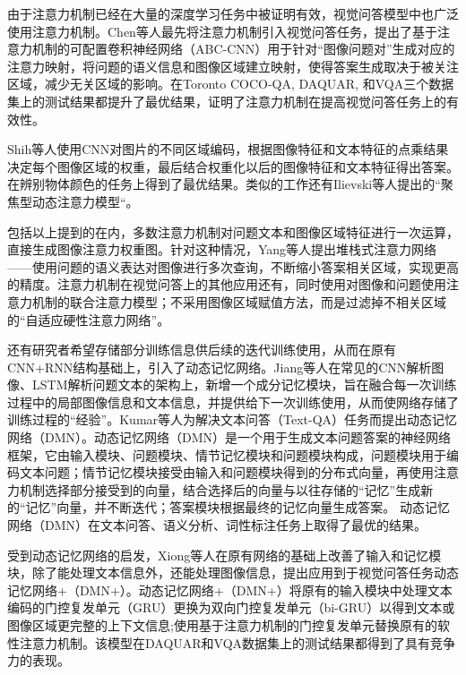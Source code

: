 由于注意力机制已经在大量的深度学习任务中被证明有效，视觉问答模型中也广泛使用注意力机制。Chen等人最先将注意力机制引入视觉问答任务，提出了基于注意力机制的可配置卷积神经网络（ABC-CNN）用于针对“图像问题对”生成对应的注意力映射，将问题的语义信息和图像区域建立映射，使得答案生成取决于被关注区域，减少无关区域的影响。在Toronto COCO-QA, DAQUAR, 和VQA三个数据集上的测试结果都提升了最优结果，证明了注意力机制在提高视觉问答任务上的有效性。

Shih等人使用CNN对图片的不同区域编码，根据图像特征和文本特征的点乘结果决定每个图像区域的权重，最后结合权重化以后的图像特征和文本特征得出答案。在辨别物体颜色的任务上得到了最优结果。类似的工作还有Ilievski等人提出的“聚焦型动态注意力模型“。

包括以上提到的在内，多数注意力机制对问题文本和图像区域特征进行一次运算，直接生成图像注意力权重图。针对这种情况，Yang等人提出堆栈式注意力网络——使用问题的语义表达对图像进行多次查询，不断缩小答案相关区域，实现更高的精度。注意力机制在视觉问答上的其他应用还有，同时使用对图像和问题使用注意力机制的联合注意力模型；不采用图像区域赋值方法，而是过滤掉不相关区域的“自适应硬性注意力网络”。

还有研究者希望存储部分训练信息供后续的迭代训练使用，从而在原有CNN+RNN结构基础上，引入了动态记忆网络。Jiang等人在常见的CNN解析图像、LSTM解析问题文本的架构上，新增一个成分记忆模块，旨在融合每一次训练过程中的局部图像信息和文本信息，并提供给下一次训练使用，从而使网络存储了训练过程的“经验”。Kumar等人为解决文本问答（Text-QA）任务而提出动态记忆网络（DMN）。动态记忆网络（DMN）是一个用于生成文本问题答案的神经网络框架，它由输入模块、问题模块、情节记忆模块和问题模块构成，问题模块用于编码文本问题；情节记忆模块接受由输入和问题模块得到的分布式向量，再使用注意力机制选择部分接受到的向量，结合选择后的向量与以往存储的“记忆”生成新的“记忆”向量，并不断迭代；答案模块根据最终的记忆向量生成答案。
动态记忆网络（DMN）在文本问答、语义分析、词性标注任务上取得了最优的结果。

受到动态记忆网络的启发，Xiong等人在原有网络的基础上改善了输入和记忆模块，除了能处理文本信息外，还能处理图像信息，提出应用到于视觉问答任务动态记忆网络+（DMN+）。动态记忆网络+（DMN+）将原有的输入模块中处理文本编码的门控复发单元（GRU）更换为双向门控复发单元（bi-GRU）以得到文本或图像区域更完整的上下文信息;使用基于注意力机制的门控复发单元替换原有的软性注意力机制。该模型在DAQUAR和VQA数据集上的测试结果都得到了具有竞争力的表现。

